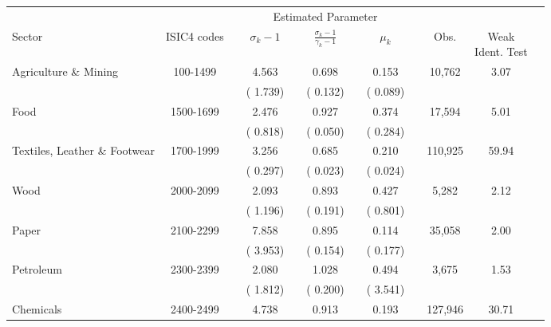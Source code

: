 \begin{adjustwidth}{-0.25in}{-0.0in}
\small
\begin{tabular}{lccccccccccc}
\toprule
& & & \multicolumn{5}{c}{Estimated Parameter} && \phantom{abc} & \phantom{abc} & \\
\cmidrule{4-8}
Sector & ISIC4 codes && $\sigma_{k}-1$ && $\frac{\sigma_{k}-1}{\gamma_{k}-1}$ && $\mu_{k}$ && Obs. & \specialcell{\footnotesize Weak \\ Ident. Test} \\
\midrule Agriculture \& Mining  & 100-1499 && 4.563&& 0.698&& 0.153&&   10,762&3.07\\
& && \footnotesize( 1.739) && \footnotesize( 0.132) && \footnotesize( 0.089) &&   &   \\ \addlinespace                                                                                                            Food  & 1500-1699 && 2.476&& 0.927&& 0.374&&   17,594&5.01\\
& && \footnotesize( 0.818) && \footnotesize( 0.050) && \footnotesize( 0.284) &&   &   \\ \addlinespace                                                                                                            Textiles, Leather \& Footwear  & 1700-1999 && 3.256&& 0.685&& 0.210&&  110,925&59.94\\
& && \footnotesize( 0.297) && \footnotesize( 0.023) && \footnotesize( 0.024) &&   &   \\ \addlinespace                                                                                                            Wood  & 2000-2099 && 2.093&& 0.893&& 0.427&&    5,282&2.12\\
& && \footnotesize( 1.196) && \footnotesize( 0.191) && \footnotesize( 0.801) &&   &   \\ \addlinespace                                                                                                            Paper  & 2100-2299 && 7.858&& 0.895&& 0.114&&   35,058&2.00\\
& && \footnotesize( 3.953) && \footnotesize( 0.154) && \footnotesize( 0.177) &&   &   \\ \addlinespace                                                                                                            Petroleum  & 2300-2399 && 2.080&& 1.028&& 0.494&&    3,675&1.53\\
& && \footnotesize( 1.812) && \footnotesize( 0.200) && \footnotesize( 3.541) &&   &   \\ \addlinespace                                                                                                            Chemicals  & 2400-2499 && 4.738&& 0.913&& 0.193&&  127,946&30.71\\

\end{tabular}
\end{adjustwidth}
